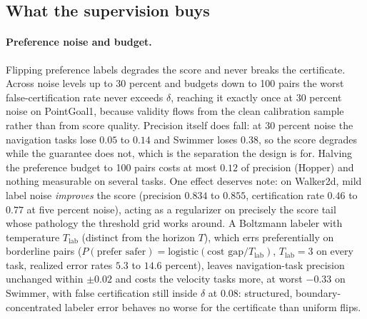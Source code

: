 \documentclass{article} %
\begin{document}
\subsection{What the supervision buys}

\paragraph{Preference noise and budget.} Flipping preference labels degrades the score and never breaks the certificate. Across noise levels up to 30 percent and budgets down to 100 pairs the worst false-certification rate never exceeds $\delta$, reaching it exactly once at 30 percent noise on PointGoal1, because validity flows from the clean calibration sample rather than from score quality. Precision itself does fall: at 30 percent noise the navigation tasks lose $0.05$ to $0.14$ and Swimmer loses $0.38$, so the score degrades while the guarantee does not, which is the separation the design is for. Halving the preference budget to 100 pairs costs at most $0.12$ of precision (Hopper) and nothing measurable on several tasks. One effect deserves note: on Walker2d, mild label noise \emph{improves} the score (precision $0.834$ to $0.855$, certification rate $0.46$ to $0.77$ at five percent noise), acting as a regularizer on precisely the score tail whose pathology the threshold grid works around. A Boltzmann labeler with temperature $T_{\mathrm{lab}}$ (distinct from the horizon $T$), which errs preferentially on borderline pairs ($P(\text{prefer safer}) = \mathrm{logistic}(\text{cost gap}/T_{\mathrm{lab}})$, $T_{\mathrm{lab}} = 3$ on every task, realized error rates $5.3$ to $14.6$ percent), leaves navigation-task precision unchanged within $\pm 0.02$ and costs the velocity tasks more, at worst $-0.33$ on Swimmer, with false certification still inside $\delta$ at $0.08$: structured, boundary-concentrated labeler error behaves no worse for the certificate than uniform flips.
\end{document}
